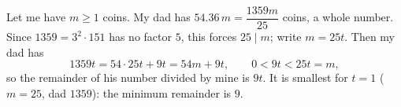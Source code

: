Let me have $m\ge1$ coins. My dad has $54.36\,m=\dfrac{1359m}{25}$ coins, a whole number. Since $1359=3^2\cdot151$ has no factor $5$, this forces $25\mid m$; write $m=25t$. Then my dad has
\[1359t=54\cdot25t+9t=54m+9t,\qquad0<9t<25t=m,\]
so the remainder of his number divided by mine is $9t$. It is smallest for $t=1$ ($m=25$, dad $1359$): the minimum remainder is $\boxed{9}$.
